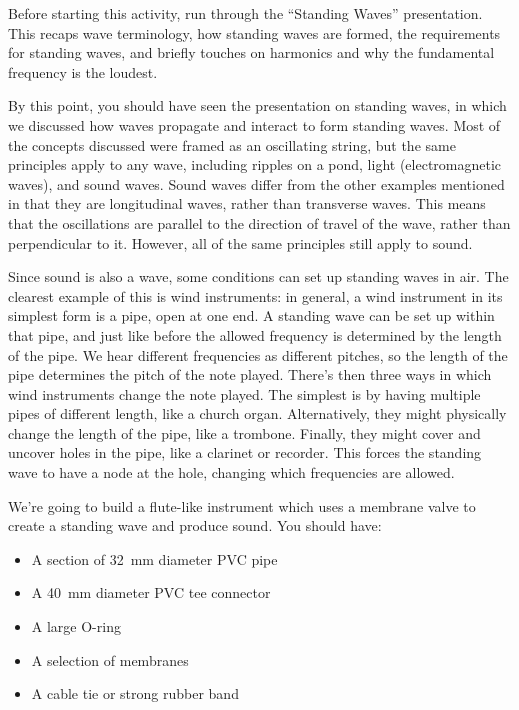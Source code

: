 \documentclass{article}
\begin{document}
\begin{instructoronly}
    Before starting this activity, run through the ``Standing Waves'' presentation. This recaps wave terminology, how standing waves are formed, the requirements for standing waves, and briefly touches on harmonics and why the fundamental frequency is the loudest.
\end{instructoronly}

By this point, you should have seen the presentation on standing waves, in which we discussed how waves propagate and interact to form standing waves. Most of the concepts discussed were framed as an oscillating string, but the same principles apply to any wave, including ripples on a pond, light (electromagnetic waves), and sound waves. Sound waves differ from the other examples mentioned in that they are longitudinal waves, rather than transverse waves. This means that the oscillations are parallel to the direction of travel of the wave, rather than perpendicular to it. However, all of the same principles still apply to sound.

Since sound is also a wave, some conditions can set up standing waves in air. The clearest example of this is wind instruments: in general, a wind instrument in its simplest form is a pipe, open at one end. A standing wave can be set up within that pipe, and just like before the allowed frequency is determined by the length of the pipe. We hear different frequencies as different pitches, so the length of the pipe determines the pitch of the note played. There's then three ways in which wind instruments change the note played. The simplest is by having multiple pipes of different length, like a church organ. Alternatively, they might physically change the length of the pipe, like a trombone. Finally, they might cover and uncover holes in the pipe, like a clarinet or recorder. This forces the standing wave to have a node at the hole, changing which frequencies are allowed.


We're going to build a flute-like instrument which uses a membrane valve to create a standing wave and produce sound. You should have:
\begin{itemize}
    \item A section of \SI{32}{\milli\meter} diameter PVC pipe
    \item A \SI{40}{\milli\meter} diameter PVC tee connector
    \item A large O-ring
    \item A selection of membranes
    \item A cable tie or strong rubber band
\end{itemize}
\end{document}
